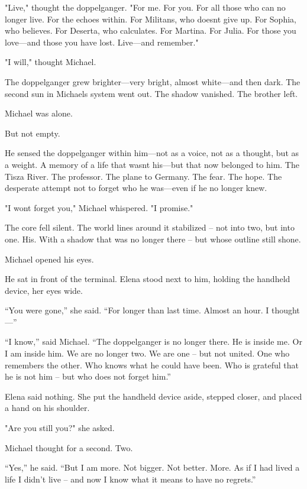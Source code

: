 \documentclass[
]{article}
\begin{document}
"Live," thought the doppelganger. "For me. For you. For all those who can no longer live. For the echoes within. For Militans, who doesn\textquotesingle t give up. For Sophia, who believes. For Deserta, who calculates. For Martina. For Julia. For those you love---and those you have lost. Live---and remember."

"I will," thought Michael.

The doppelganger grew brighter---very bright, almost white---and then dark. The second sun in Michael\textquotesingle s system went out. The shadow vanished. The brother left.

Michael was alone.

But not empty.

He sensed the doppelganger within him---not as a voice, not as a thought, but as a weight. A memory of a life that wasn\textquotesingle t his---but that now belonged to him. The Tisza River. The professor. The plane to Germany. The fear. The hope. The desperate attempt not to forget who he was---even if he no longer knew.

"I won\textquotesingle t forget you," Michael whispered. "I promise."

The core fell silent. The world lines around it stabilized -- not into two, but into one. His. With a shadow that was no longer there -- but whose outline still shone.

Michael opened his eyes.

He sat in front of the terminal. Elena stood next to him, holding the handheld device, her eyes wide.

``You were gone,'' she said. ``For longer than last time. Almost an hour. I thought---''

``I know,'' said Michael. ``The doppelganger is no longer there. He is inside me. Or I am inside him. We are no longer two. We are one -- but not united. One who remembers the other. Who knows what he could have been. Who is grateful that he is not him -- but who does not forget him.''

Elena said nothing. She put the handheld device aside, stepped closer, and placed a hand on his shoulder.

"Are you still you?" she asked.

Michael thought for a second. Two.

``Yes,'' he said. ``But I am more. Not bigger. Not better. More. As if I had lived a life I didn't live -- and now I know what it means to have no regrets.''
\end{document}
